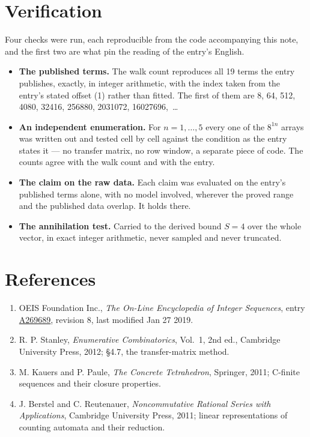 \documentclass[11pt]{article}
\theoremstyle{definition}
\begin{document}
\section{Verification}

Four checks were run, each reproducible from the code accompanying this note, and the first two are what pin the reading of the entry's English.

\begin{itemize}

\item {\bfseries The published terms.} The walk count reproduces all 19 terms the entry publishes, exactly, in integer arithmetic, with the index taken from the entry's stated offset (1) rather than fitted. The first of them are 8, 64, 512, 4080, 32416, 256880, 2031072, 16027696,~\dots

\item {\bfseries An independent enumeration.} For $n = 1,\dots,5$ every one of the $8^{1n}$ arrays was written out and tested cell by cell against the condition as the entry states it --- no transfer matrix, no row window, a separate piece of code. The counts agree with the walk count and with the entry.

\item {\bfseries The claim on the raw data.} Each claim was evaluated on the entry's published terms alone, with no model involved, wherever the proved range and the published data overlap. It holds there.

\item {\bfseries The annihilation test.} Carried to the derived bound $S = 4$ over the whole vector, in exact integer arithmetic, never sampled and never truncated.

\end{itemize}

\section{References}

\begin{enumerate}

\item OEIS Foundation Inc., \emph{The On-Line Encyclopedia of Integer Sequences}, entry \href{https://oeis.org/A269689}{A269689}, revision 8, last modified Jan 27 2019.

\item R. P. Stanley, \emph{Enumerative Combinatorics}, Vol.~1, 2nd ed., Cambridge University Press, 2012; \S4.7, the transfer-matrix method.

\item M. Kauers and P. Paule, \emph{The Concrete Tetrahedron}, Springer, 2011; C-finite sequences and their closure properties.

\item J. Berstel and C. Reutenauer, \emph{Noncommutative Rational Series with Applications}, Cambridge University Press, 2011; linear representations of counting automata and their reduction.

\end{enumerate}
\end{document}
